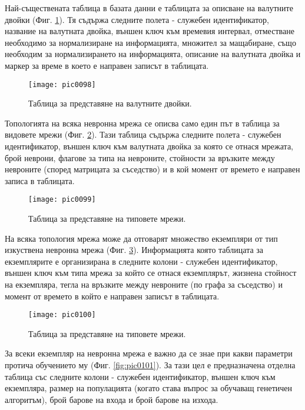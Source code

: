 Най-съществената таблица в базата данни е таблицата за описване на валутните двойки (Фиг. \ref{fig:pic0098}). Тя съдържа следните полета - служебен идентификатор, название на валутната двойка, външен ключ към времевия интервал, отместване необходимо за нормализиране на информацията, множител за мащабиране, също необходим за нормализирането на информацията, описание на валутната двойка и маркер за време в което е направен записът в таблицата. 

\begin{figure}[h]
  \centering
  \texttt{[image: pic0098]}
  \caption{Таблица за представяне на валутните двойки.}
\label{fig:pic0098}
\end{figure}
\FloatBarrier

Топологията на всяка невронна мрежа се описва само един път в таблица за видовете мрежи (Фиг. \ref{fig:pic0099}). Тази таблица съдържа следните полета - служебен идентификатор, външен ключ към валутната двойка за която се отнася мрежата, брой неврони, флагове за типа на невроните, стойности за връзките между невроните (според матрицата за съседство) и в кой момент от времето е направен записа в таблицата. 

\begin{figure}[h]
  \centering
  \texttt{[image: pic0099]}
  \caption{Таблица за представяне на типовете мрежи.}
\label{fig:pic0099}
\end{figure}
\FloatBarrier

На всяка топология мрежа може да отговарят множество екземпляри от тип изкуствена невронна мрежа (Фиг. \ref{fig:pic0100}). Информацията която таблицата за екземплярите е организирана в следните колони - служебен идентификатор, външен ключ към типа мрежа за който се отнася екземплярът, жизнена стойност на екземпляра, тегла на връзките между невроните (по графа за съседство) и момент от времето в който е направен записът в таблицата. 

\begin{figure}[h]
  \centering
  \texttt{[image: pic0100]}
  \caption{Таблица за представяне на типовете мрежи.}
\label{fig:pic0100}
\end{figure}
\FloatBarrier

За всеки екземпляр на невронна мрежа е важно да се знае при какви параметри протича обучението му (Фиг. \ref{fig:pic0101}). За тази цел е предназначена отделна таблица със следните колони - служебен идентификатор, външен ключ към екземпляра, размер на популацията (когато става въпрос за обучаващ генетичен алгоритъм), брой барове на входа и брой барове на изхода.

